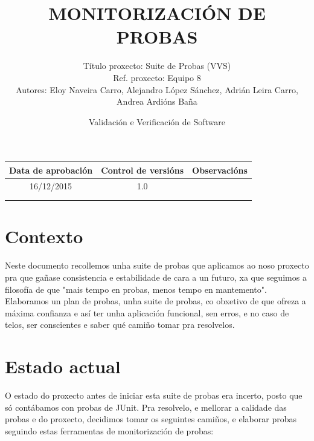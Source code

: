 \documentclass[DIV=calc,paper=a4,fontsize=11pt,onecolumn]{scrartcl}	 %
\title{MONITORIZACIÓN DE PROBAS} %
\author{Título proxecto: Suite de Probas (VVS) \\
        Ref. proxecto: Equipo 8 \\
        Autores: Eloy Naveira Carro, Alejandro López Sánchez, Adrián Leira Carro, Andrea Ardións Baña}
\date{\sffamily Validación e Verificación de Software} %
\begin{document}
\maketitle %
\thispagestyle{fancy} %


\vspace*{1cm}

\begin{center}
\small \sffamily
\begin{tabular}{c|c|c}
Data de aprobación & Control de versións & Observacións \\  \hline 
16/12/2015 & 1.0 & \\ \hline
& & \\ \hline
& & \\
\end{tabular}
\end{center}

\clearpage


\section{Contexto}

Neste documento recollemos unha suite de probas que aplicamos ao noso proxecto pra que gañase consistencia e estabilidade de cara a un futuro, xa que seguimos a filosofía de que "mais tempo en probas, menos tempo en mantemento". \\
	
	Elaboramos un plan de probas, unha suite de probas, co obxetivo de que ofreza a máxima confianza e así ter unha aplicación funcional, sen erros, e no caso de telos, ser conscientes e saber qué camiño tomar pra resolvelos.

\section{Estado actual}

O estado do proxecto antes de iniciar esta suite de probas era incerto, posto que só contábamos con probas de JUnit. Pra resolvelo, e mellorar a calidade das probas e do proxecto, decidimos tomar os seguintes camiños, e elaborar probas seguindo estas ferramentas de monitorización de probas: 
\end{document}
